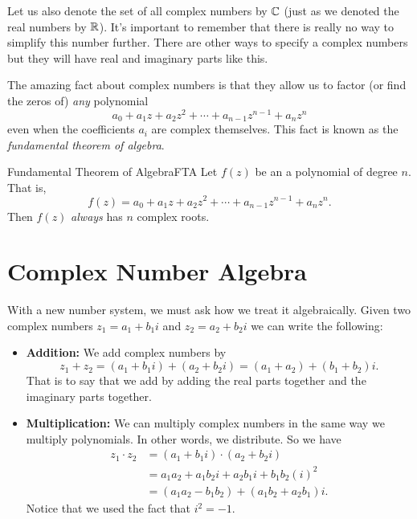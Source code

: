         \noindent Let us also denote the set of all complex numbers by $\mathbb{C}$ (just as we denoted the real numbers by $\mathbb{R}$). It's important to remember that there is really no way to simplify this number further. There are other ways to specify a complex numbers but they will have real and imaginary parts like this.
        
        The amazing fact about complex numbers is that they allow us to factor (or find the zeros of) \emph{any} polynomial
        \[
        a_0+a_1 z + a_2 z^2 + \cdots + a_{n-1}z^{n-1}+ a_n z^n
        \]
        even when the coefficients $a_i$ are complex themselves.  This fact is known as the \emph{fundamental theorem of algebra}.
        
        \begin{thm}{Fundamental Theorem of Algebra}{FTA}
        Let $f(z)$ be an a polynomial of degree $n$. That is,
        \[
        f(z)=a_0+a_1 z + a_2 z^2 + \cdots + a_{n-1} z^{n-1} + a_n z^n.
        \]
        Then $f(z)$ \emph{always} has $n$ complex roots.
        \end{thm}
        
        \section{Complex Number Algebra}
        
        With a new number system, we must ask how we treat it algebraically. Given two complex numbers $z_1=a_1+b_1i$ and $z_2=a_2+b_2i$ we can write the following:
        \begin{itemize} 
            \item \textbf{Addition:} We add complex numbers by
            \[
            z_1+z_2=(a_1+b_1i)+(a_2+b_2i)=(a_1+a_2)+(b_1+b_2)i.
            \]
            That is to say that we add by adding the real parts together and the imaginary parts together. 
            
            \item \textbf{Multiplication:} We can multiply complex numbers in the same way we multiply polynomials.  In other words, we distribute.  So we have
            \begin{align*}
            z_1\cdot z_2 &= (a_1+b_1i)\cdot (a_2+b_2i)\\
            &= a_1a_2+a_1b_2i+a_2b_1i+b_1b_2(i)^2\\
            &=(a_1a_2-b_1b_2)+(a_1b_2+a_2b_1)i.
            \end{align*}
            Notice that we used the fact that $i^2=-1$.
        \end{itemize}
        
